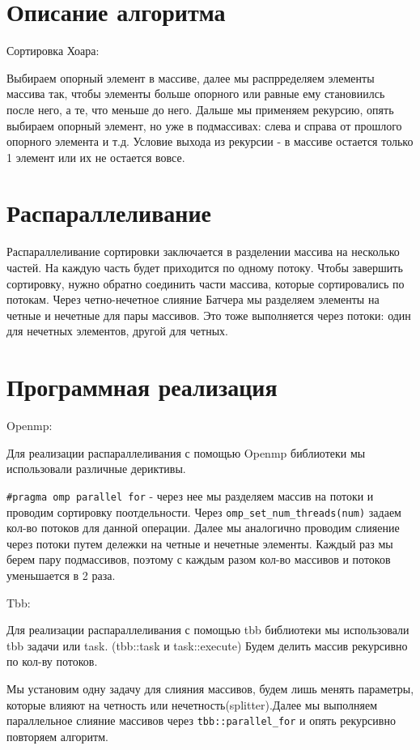\documentclass{report}
\begin{document}
\newpage
\section*{Описание алгоритма}

\par Сортировка Хоара:
\par Выбираем опорный элемент в массиве, далее мы распрределяем элементы массива так, чтобы элементы больше опорного или равные ему становиилсь после него, а те, что меньше до него. Дальше мы применяем рекурсию, опять выбираем опорный элемент, но уже в подмассивах: слева и справа от прошлого опорного элемента и т.д. Условие выхода из рекурсии - в массиве остается только 1 элемент или их не остается вовсе.


\newpage
\section*{Распараллеливание}
\par Распараллеливание сортировки заключается в разделении массива на несколько частей. На каждую часть будет приходится по одному потоку. Чтобы завершить сортировку, нужно обратно соединить части массива, которые сортировались по потокам. Через четно-нечетное слияние Батчера мы разделяем элементы на четные и нечетные для пары массивов. Это тоже выполняется через потоки: один для нечетных элементов, другой для четных. 


\newpage
\section*{Программная реализация}
\par Openmp:
\par Для реализации распараллеливания с помощью Openmp библиотеки мы использовали различные дериктивы. 
\par \verb|#pragma omp parallel for| - через нее мы разделяем массив на потоки и проводим сортировку поотдельности. Через \verb|omp_set_num_threads(num)| задаем кол-во потоков для данной операции. 
Далее мы аналогично проводим слияение через потоки путем дележки на четные и нечетные элементы. Каждый раз мы берем пару подмассивов, поэтому с каждым разом кол-во массивов и потоков уменьшается в 2 раза.
\par Tbb:
\par Для реализации распараллеливания с помощью tbb библиотеки мы  использовали tbb задачи или task. (tbb::task и task::execute)
 Будем делить массив рекурсивно по кол-ву потоков. 
\par Мы установим одну задачу для слияния массивов, будем лишь менять параметры, которые влияют на четность или нечетность(splitter).Далее мы выполняем параллельное слияние массивов через \verb|tbb::parallel_for| и опять рекурсивно повторяем алгоритм.
\end{document}
